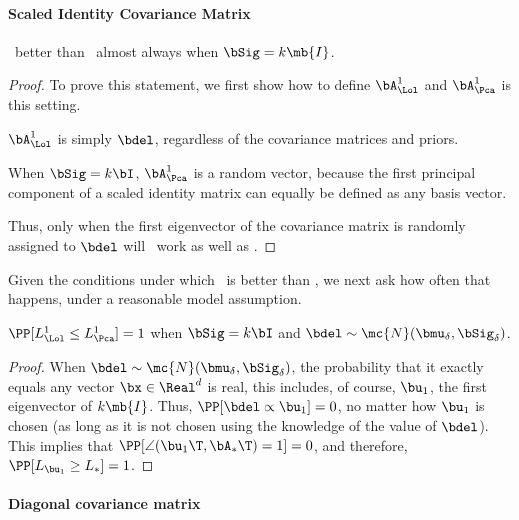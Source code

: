 \documentclass[10pt]{article}
\begin{document}
\paragraph{Scaled Identity Covariance Matrix}


\begin{lem}
\Lol~better than \Pca~almost always when $\bSig=k \mb{I}$.
\end{lem}

\begin{proof}
To prove this statement, we first show how to define $\bA_{\Lol}^1$ and $\bA_{\Pca}^1$ is this setting.

\begin{compactitem}
\item $\bA_{\Lol}^1$ is simply $\bdel$, regardless of the covariance matrices and priors.
\item When $\bSig=k \bI$, $\bA_{\Pca}^1$ is a random vector, because the first principal component of a scaled identity matrix can equally be defined as any basis vector.
\end{compactitem}

Thus, only when the first eigenvector of the covariance matrix is randomly assigned to $\bdel$ will \Pca~work as well as \Lol.
\end{proof}


Given the conditions under which \Lol~is better than \Pca, we next ask how often that happens, under a reasonable model assumption.

\begin{lem}
$\PP[L_{\Lol}^1 \leq L_{\Pca}^1]=1$ when $\bSig=k \bI$ and $\bdel \sim \mc{N}(\bmu_{\delta},\bSig_{\delta})$.
\end{lem}

\begin{proof}
When $\bdel \sim \mc{N}(\bmu_\delta,\bSig_\delta)$, the probability that it exactly equals any vector $\bx \in \Real^d$ is real, this includes, of course,  $\bu_1$, the first eigenvector of $k \mb{I}$.  Thus, $\PP[\bdel \propto \bu_1]=0$, no matter how $\bu_1$ is chosen (as long as it is not chosen using the knowledge of the value of $\bdel$). 
This implies that $\PP[\angle(\bu_1\T,\bA_*\T) =1 ] = 0$, and therefore, $\PP[L_{\bu_1} \geq L_*] =1$.
\end{proof}


\paragraph{Diagonal covariance matrix}
\end{document}
